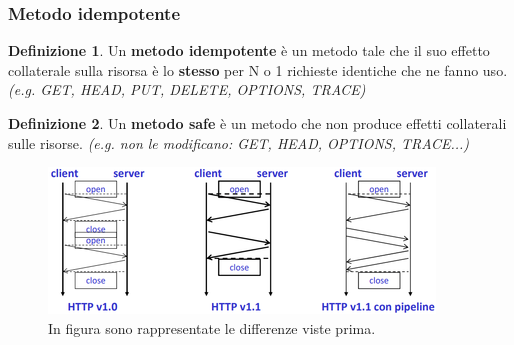 \documentclass[11pt,a4paper,oneside]{book}
\theoremstyle{definition}
\newtheorem{definition}{Definizione}[section]
\begin{document}
\subsubsection{Metodo idempotente}
\begin{definition}
	Un \textbf{metodo idempotente} è un metodo tale che il suo effetto collaterale sulla risorsa è lo \textbf{stesso} per N o 1 richieste identiche che ne fanno uso. \textit{(e.g. GET, HEAD, PUT, DELETE, OPTIONS, TRACE)}
\end{definition}
\theoremstyle{definition}
\begin{definition}
	Un \textbf{metodo safe} è un metodo che non produce effetti collaterali sulle risorse. \textit{(e.g. non le modificano: GET, HEAD, OPTIONS, TRACE...)}
\end{definition}
\begin{figure}[!h]
	\includegraphics[scale=0.65]{Immagini/Http_vs.png}
	\centering
	\caption{In figura sono rappresentate le differenze viste prima.}
\end{figure}
\end{document}
